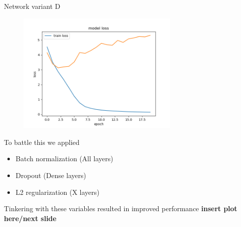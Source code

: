 \documentclass{beamer}
\begin{document}
\begin{frame}
\centering
Network variant D
\begin{figure}[!h]
\centering
\includegraphics[width=0.7\textwidth]{images/run1_loss_d.png}
\end{figure}
\end{frame}




\begin{frame}
  To battle this we applied
  \begin{itemize}
    \item Batch normalization (All layers)
    \item Dropout (Dense layers)
    \item L2 regularization (X layers)
  \end{itemize}
  Tinkering with these variables resulted in improved performance \textbf{insert plot here/next slide}
\end{frame}
\end{document}
